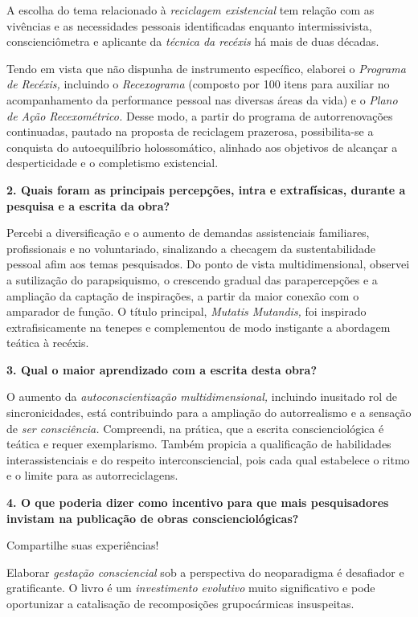 \documentclass{gescons}
\begin{document}
\begin{multicols}{2}
A escolha do tema relacionado à \emph{reciclagem existencial} tem relação com as vivências e as necessidades pessoais identificadas enquanto intermissivista, conscienciômetra e aplicante da \emph{técnica da recéxis} há mais de duas décadas.

Tendo em vista que não dispunha de instrumento específico, elaborei o \emph{Programa de Recéxis,} incluindo o \emph{Recexograma} (composto por 100 itens para auxiliar no acompanhamento da performance pessoal nas diversas áreas da vida) e o \emph{Plano de Ação Recexométrico.} Desse modo, a partir do programa de autorrenovações continuadas, pautado na proposta de reciclagem prazerosa, possibilita-se a conquista do autoequilíbrio holossomático, alinhado aos objetivos de alcançar a desperticidade e o completismo existencial.

\textbf{2. Quais foram as principais percepções, intra e extrafísicas, durante a pesquisa e a escrita da obra?}

Percebi a diversificação e o aumento de demandas assistenciais familiares, profissionais e no voluntariado, sinalizando a checagem da sustentabilidade pessoal afim aos temas pesquisados. Do ponto de vista multidimensional, observei a sutilização do parapsiquismo, o crescendo gradual das parapercepções e a ampliação da captação de inspirações, a partir da maior conexão com o amparador de função. O título principal, \emph{Mutatis Mutandis,} foi inspirado extrafisicamente na tenepes e complementou de modo instigante a abordagem teática à recéxis.

\textbf{3. Qual o maior aprendizado com a escrita desta obra?}

O aumento da \emph{autoconscientização multidimensional,} incluindo inusitado rol de sincronicidades, está contribuindo para a ampliação do autorrealismo e a sensação de \emph{ser consciência.} Compreendi, na prática, que a escrita conscienciológica é teática e requer exemplarismo. Também propicia a qualificação de habilidades interassistenciais e do respeito interconsciencial, pois cada qual estabelece o ritmo e o limite para as autorreciclagens.

\textbf{4. O que poderia dizer como incentivo para que mais pesquisadores invistam na publicação de obras conscienciológicas?}

Compartilhe suas experiências!

Elaborar \emph{gestação consciencial} sob a perspectiva do neoparadigma é desafiador e gratificante. O livro é um \emph{investimento evolutivo} muito significativo e pode oportunizar a catalisação de recomposições grupocármicas insuspeitas.

% 
    
    \end{multicols}
\end{document}
